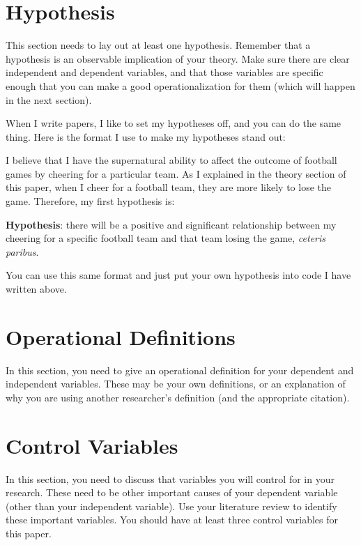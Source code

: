 \documentclass{turabian-researchpaper}
\begin{document}
\section{Hypothesis}
This section needs to lay out at least one hypothesis. Remember that a hypothesis is an observable implication of your theory. Make sure there are clear independent and dependent variables, and that those variables are specific enough that you can make a good operationalization for them (which will happen in the next section).

When I write papers, I like to set my hypotheses off, and you can do the same thing. Here is the format I use to make my hypotheses stand out:

I believe that I have the supernatural ability to affect the outcome of football games by cheering for a particular team. As I explained in the theory section of this paper, when I cheer for a football team, they are more likely to lose the game. Therefore, my first hypothesis is:

\begin{description}
		\item \textbf{Hypothesis}: there will be a positive and significant relationship between my cheering for a specific football team and that team losing the game, \emph{ceteris paribus}.
	\end{description} 

You can use this same format and just put your own hypothesis into code I have written above.

\section{Operational Definitions}
In this section, you need to give an operational definition for your dependent and independent variables. These may be your own definitions, or an explanation of why you are using another researcher's definition (and the appropriate citation). 

\section{Control Variables}
In this section, you need to discuss that variables you will control for in your research. These need to be other important causes of your dependent variable (other than your independent variable). Use your literature review to identify these important variables. You should have at least three control variables for this paper.
\end{document}
